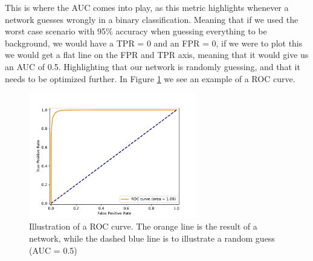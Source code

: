 \documentclass[12pt, a4paper]{book}
\begin{document}
This is where the AUC comes into play, as this metric highlights whenever a network guesses wrongly in a binary classification. Meaning that if we used the worst case scenario with 95\% accuracy when guessing everything to be background, we would have a TPR = 0 and an FPR = 0, 
if we were to plot this we would get a flat line on the FPR and TPR axis, meaning that it would give us an AUC of 0.5. Highlighting that our network is randomly guessing, and that it needs to be optimized further. In Figure \ref{fig:ROC} we see an example of a ROC curve.
\graphicspath{{../../../Plots/Plot_types/}}
\begin{figure}[!ht]
	\centering
    \includegraphics[width=0.65\textwidth]{ROC.pdf}
    \caption[ROC curve illustration]{Illustration of a ROC curve. The orange line is the result of a network, while the dashed blue line is to illustrate a random guess (AUC = 0.5)}\label{fig:ROC}
\end{figure}
\end{document}
